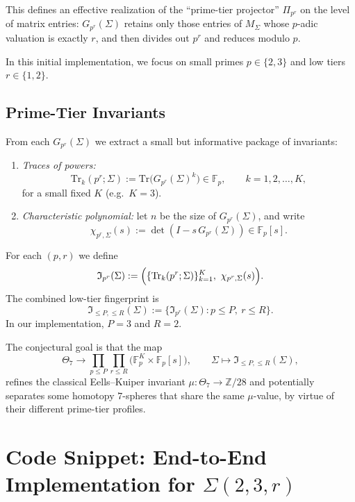 \documentclass[11pt]{article}
\begin{document}
This defines an effective realization of the ``prime-tier projector'' $\Pi_{p^r}$ on the level of matrix entries: $G_{p^r}(\Sigma)$ retains only those entries of $M_\Sigma$ whose $p$-adic valuation is exactly $r$, and then divides out $p^r$ and reduces modulo $p$.

In this initial implementation, we focus on small primes $p\in\{2,3\}$ and low tiers $r\in\{1,2\}$.

\subsection{Prime-Tier Invariants}

From each $G_{p^r}(\Sigma)$ we extract a small but informative package of invariants:

\begin{enumerate}[label=(\alph*),leftmargin=1.5em]
  \item \emph{Traces of powers:}
  \[
    \mathrm{Tr}_k(p^r;\Sigma) := \mathrm{Tr}\bigl(G_{p^r}(\Sigma)^k\bigr)\in\mathbb F_p,
    \qquad k = 1,2,\dots,K,
  \]
  for a small fixed $K$ (e.g.\ $K=3$).
  \item \emph{Characteristic polynomial:} let $n$ be the size of $G_{p^r}(\Sigma)$, and write
  \[
    \chi_{p^r,\Sigma}(s) := \det(I - s\,G_{p^r}(\Sigma)) \in \mathbb F_p[s].
  \]
\end{enumerate}

\begin{definition}
For each $(p,r)$ we define
\[
  \mathfrak I_{p^r}(\Sigma) :=
    \Bigl( \{\mathrm{Tr}_k(p^r;\Sigma)\}_{k=1}^K,\ \chi_{p^r,\Sigma}(s)\Bigr).
\]
The combined low-tier fingerprint is
\[
  \mathfrak I_{\le P,\le R}(\Sigma) := 
  \bigl\{\mathfrak I_{p^r}(\Sigma) : p\le P,\ r\le R \bigr\}.
\]
In our implementation, $P=3$ and $R=2$.
\end{definition}

The conjectural goal is that the map
\[
  \Theta_7 \longrightarrow
  \prod_{p\le P}\prod_{r\le R}
  \bigl(\mathbb F_p^K \times \mathbb F_p[s]\bigr),
  \qquad \Sigma \mapsto \mathfrak I_{\le P,\le R}(\Sigma),
\]
refines the classical Eells--Kuiper invariant $\mu:\Theta_7\to \mathbb Z/28$ and potentially separates some homotopy $7$-spheres that share the same $\mu$-value, by virtue of their different prime-tier profiles.\cite{exotic-mult}

\section{Code Snippet: End-to-End Implementation for \texorpdfstring{$\Sigma(2,3,r)$}{Σ(2,3,r)}}
\end{document}
